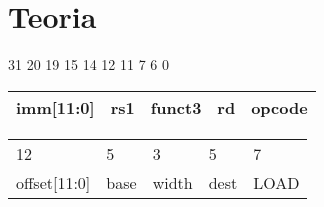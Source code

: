     \section{Teoria}

    \begin{frame}
        
        \begin{center}

            \begin{flushleft}
                \footnotesize
                31 \hspace{2.95cm} 20 19 \hspace{1.52cm} 15 14 \hspace{1.50cm} 12 11 \hspace{1.70cm} 7 6 \hspace{2cm} 0
                \normalsize
            \end{flushleft}
            
            \begin{tabular}{ | p{3cm} | p{2cm} | p{2cm} | p{2cm} | p{2cm} | }
                \hline
                imm[11:0] & rs1 & funct3 & rd & opcode \\
                \hline
            \end{tabular}
            \begin{tabular}{p{3cm} p{2cm} p{2cm} p{2cm} p{2cm}}
             12 & 5 & 3 & 5 & 7 \\ 
             offset[11:0] & base & width & dest & LOAD    
            \end{tabular}

        \end{center}

\end{frame}
